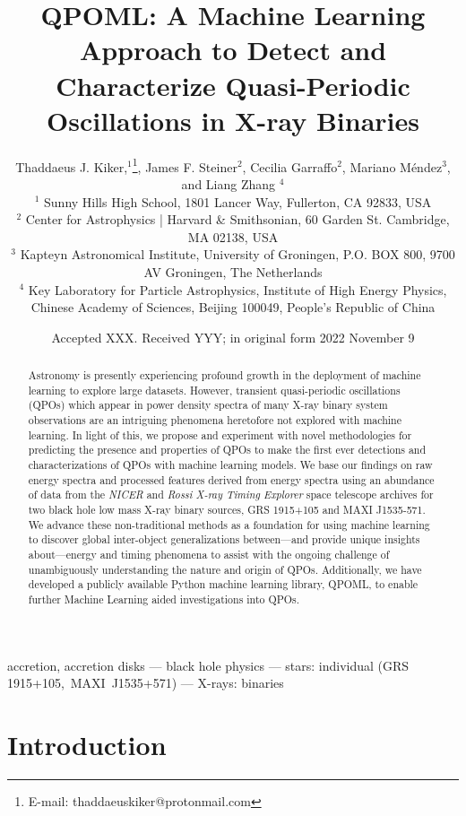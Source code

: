 \documentclass[fleqn,usenatbib,twocolumn]{mnras}%
\date{}
\title[QPOML: Quasi-Periodic Oscillations and Machine Learning]{QPOML: A Machine Learning Approach to Detect and Characterize Quasi-Periodic Oscillations in X-ray Binaries}
\author[Kiker et al.]{Thaddaeus J. Kiker,$^{1}$\thanks{E-mail: thaddaeuskiker@protonmail.com}, James F. Steiner$^{2}$,
Cecilia Garraffo$^{2}$, Mariano M\'endez$^3$, and Liang Zhang $^{4}$\\
$^{1}$ Sunny Hills High School, 1801 Lancer Way, Fullerton, CA 92833, USA\\
$^{2}$ Center for Astrophysics | Harvard \& Smithsonian, 60 Garden St. Cambridge, MA 02138, USA\\
$^{3}$ Kapteyn Astronomical Institute, University of Groningen, P.O. BOX 800, 9700 AV Groningen, The Netherlands\\
$^{4}$ Key Laboratory for Particle Astrophysics, Institute of High Energy Physics, Chinese Academy of Sciences, Beijing 100049, People's Republic of China
}
\date{Accepted XXX. Received YYY; in original form 2022 November 9}
\begin{document}
\label{firstpage}  
\pagerange{\pageref{firstpage}--\pageref{lastpage}}
\maketitle

\begin{abstract}
Astronomy is presently experiencing profound growth in the deployment of machine learning to explore large datasets. However, transient quasi-periodic oscillations (QPOs) which appear in power density spectra of many X-ray binary system observations are an intriguing phenomena heretofore not explored with machine learning. In light of this, we propose and experiment with novel methodologies for predicting the presence and properties of QPOs to make the first ever detections and characterizations of QPOs with machine learning models. We base our findings on raw energy spectra and processed features derived from energy spectra using an abundance of data from the \textit{NICER} and \textit{Rossi X-ray Timing Explorer} space telescope archives for two black hole low mass X-ray binary sources, GRS 1915+105 and MAXI J1535-571. We advance these non-traditional methods as a foundation for using machine learning to discover global inter-object generalizations between—and provide unique insights about—energy and timing phenomena to assist with the ongoing challenge of unambiguously understanding the nature and origin of QPOs. Additionally, we have developed a publicly available Python machine learning library, QPOML, to enable further Machine Learning aided investigations into QPOs.
\end{abstract}

\begin{keywords}
accretion, accretion disks --- black hole physics --- stars: individual (GRS\, 1915+105,\, MAXI\, J1535+571) --- X-rays: binaries
\end{keywords}

\section{Introduction}
\end{document}
